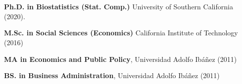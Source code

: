 \documentclass[letterpaper, 9pt]{article}
\newcommand{\myorange}{myteal!70!black}
\newcommand{\darkorange}{\myorange !50!black}
\renewcommand{\bf}{\bfseries\color{\myorange}}
\renewenvironment{itemize}{
  \begin{list}{}{
    \setlength{\leftmargin}{0.3cm}
  }
}{
  \end{list}
}
\begin{document}
\vspace{-.25cm}
\section*{\color{\darkorange}{Education}}
\vspace{-.25cm}

\begin{itemize}
\item 
{\bf Ph.D. in Biostatistics (Stat. Comp.)} University of Southern California (2020).

{\bf M.Sc. in Social Sciences (Economics)} California Institute of Technology (2016)

{\bf MA in Economics and Public Policy}, Universidad Adolfo Ib\'a\~nez (2011)

{\bf BS. in Business Administration}, Universidad Adolfo Ib\'a\~nez (2011)
\end{itemize}

\vspace{-.6cm}
\section*{\color{\darkorange}{Professional Experience}}
\vspace{-.3cm}
\end{document}
